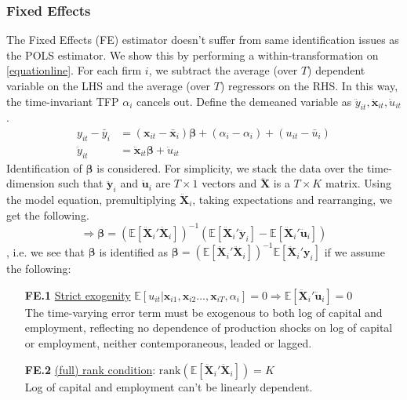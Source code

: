 \subsubsection*{Fixed Effects}
The Fixed Effects (FE) estimator doesn't suffer from same identification issues as the POLS estimator. We show this by performing a within-transformation on \eqref{equationline}. For each firm $i$, we subtract the average (over $T$) dependent variable  on the LHS and the average (over $T$) regressors on the RHS. In this way, the time-invariant TFP $\alpha_i$ cancels out. Define the demeaned variable as $ \ddot{y}_{it}, \pmb{\ddot{x}}_{it}, \ddot{u}_{it}$.
\begin{align*}
    y_{it}-\bar{y}_{i} &=(\pmb{x}_{it}-\bar{\pmb{x}}_{i}) \pmb{\beta}+(\alpha_i-\alpha_i)+(u_{it} - \bar{u}_{i}) \\
    \ddot{y}_{it} &=  \ddot{\pmb{x}}_{it} \pmb{\beta}+\ddot{u}_{it}
\end{align*}
Identification of $\pmb{\beta}$ is considered. For simplicity, we stack the data over the time-dimension such that $\ddot{\pmb{y}}_{i}$ and $\ddot{\pmb{u}}_{i}$ are $T \times 1$ vectors and $\pmb{\ddot{X}}$ is a $T\times K$ matrix. Using the model equation, premultiplying $\pmb{\ddot{X}}_{i}$, taking expectations and rearranging, we get the following.
$$ \Rightarrow  \pmb{\beta} = (\mathbb{E}[\pmb{\ddot{X}}_{i}'\pmb{\ddot{X}}_{i}])^{-1} \left(  \mathbb{E}[\pmb{\ddot{X}}_{i}'\pmb{\ddot{y}}_{i}]-\mathbb{E}[\pmb{\ddot{X}}_{i}' \pmb{\ddot{u}}_{i}]\right)$$
, i.e. we see that $\pmb{\beta}$ is identified as $\pmb{\beta} = (\mathbb{E}[\pmb{\ddot{X}}_{i}'\pmb{\ddot{X}}_{i}])^{-1} \mathbb{E}[\pmb{\ddot{X}}_{i}'\pmb{y}_{i}]$ if we assume the following:
\begin{enumerate}
    \item[\textbf{FE.1}] \underline{Strict exogenity} $\mathbb{E}[u_{it}\vert \pmb{x}_{i1},\pmb{x}_{i2}\dots,\pmb{x}_{iT},\alpha_i]=0\Rightarrow \mathbb{E}[\pmb{\ddot{X}}_{i}' \pmb{\ddot{u}}_{i}]=0$ \\
    The time-varying error term must be exogenous to both log of capital and employment, reflecting no dependence of production shocks on log of capital or employment, neither contemporaneous, leaded or lagged.
    \item[\textbf{FE.2}] \underline{ (full) rank condition}: $\text{rank}(\mathbb{E}[\pmb{\ddot{X}}_{i}'\pmb{\ddot{X}}_{i}])=K$ \\
    Log of capital and employment can't be linearly dependent.
\end{enumerate}

